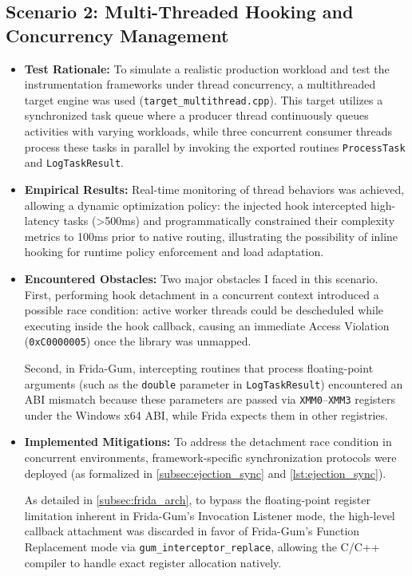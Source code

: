 \subsection{Scenario 2: Multi-Threaded Hooking and Concurrency Management}
\label{subsec:scenario_2}

\begin{itemize}
	\item \textbf{Test Rationale:} To simulate a realistic production workload and test the instrumentation frameworks under thread concurrency, a multithreaded target engine was used (\texttt{target\_multithread.cpp}). This target utilizes a synchronized task queue where a producer thread continuously queues activities with varying workloads, while three concurrent consumer threads process these tasks in parallel by invoking the exported routines \texttt{ProcessTask} and \texttt{LogTaskResult}.
	
	\item \textbf{Empirical Results:} Real-time monitoring of thread behaviors was achieved, allowing a dynamic optimization policy: the injected hook intercepted high-latency tasks (>500ms) and programmatically constrained their complexity metrics to 100ms prior to native routing, illustrating the possibility of inline hooking for runtime policy enforcement and load adaptation.
	
	\item \textbf{Encountered Obstacles:} Two major obstacles I faced in this scenario. First, performing hook detachment in a concurrent context introduced a possible race condition: active worker threads could be descheduled while executing inside the hook callback, causing an immediate Access Violation (\texttt{0xC0000005}) once the library was unmapped. 
	
	Second, in Frida-Gum, intercepting routines that process floating-point arguments (such as the \texttt{double} parameter in \texttt{LogTaskResult}) encountered an ABI mismatch because these parameters are passed via \texttt{XMM0}--\texttt{XMM3} registers under the Windows x64 ABI, while Frida expects them in other registries.
	
	\item \textbf{Implemented Mitigations:} To address the detachment race condition in concurrent environments, framework-specific synchronization protocols were deployed (as formalized in \cref{subsec:ejection_sync} and \cref{lst:ejection_sync}).	
	
	As detailed in \cref{subsec:frida_arch}, to bypass the floating-point register limitation inherent in Frida-Gum's Invocation Listener mode, the high-level callback attachment was discarded in favor of Frida-Gum's Function Replacement mode via \texttt{gum\_\allowbreak interceptor\_\allowbreak replace}, allowing the C/C++ compiler to handle exact register allocation natively.

\end{itemize}

